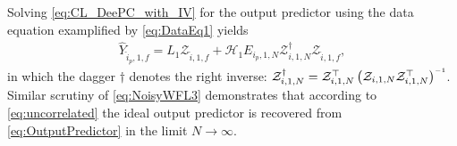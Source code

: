 Solving \eqref{eq:CL_DeePC_with_IV} for the output predictor using the data equation examplified by \eqref{eq:DataEq1} yields
\begin{align}\label{eq:OutputPredictor}
    \widehat{Y}_{\hat{i}_p,1,f} = L_1 \mathcal{Z}_{\hat{i},1,f} + \mathcal{H}_1 E_{i_p,1,N}\mathcal{Z}_{i,1,N}^\dagger\mathcal{Z}_{\hat{i},1,f},
\end{align}
in which the dagger $\dagger$ denotes the right inverse: ${\mathcal{Z}_{i,1,N}^\dagger=\mathcal{Z}_{i,1,N}^\top\left(\mathcal{Z}_{i,1,N}\mathcal{Z}_{i,1,N}^\top\right)\inv}$. Similar scrutiny of \eqref{eq:NoisyWFL3} demonstrates that according to \eqref{eq:uncorrelated} the ideal output predictor is recovered from \eqref{eq:OutputPredictor} in the limit $N\rightarrow\infty$.


